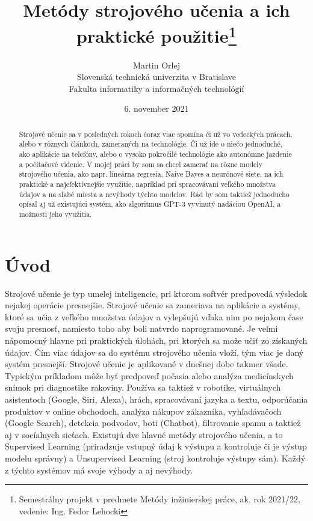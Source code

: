 \documentclass[8pt,oneside,slovak,a4paper]{article}
\title{Metódy strojového učenia a ich praktické použitie\thanks{Semestrálny projekt v predmete Metódy inžinierskej práce, ak. rok 2021/22, vedenie: Ing. Fedor Lehocki}}
\author{Martin Orlej\\[2pt]
	{\small Slovenská technická univerzita v Bratislave}\\
	{\small Fakulta informatiky a informačných technológií}\\
	}
\date{\small 6. november 2021}
\begin{document}
\maketitle
\newpage
\begin{abstract}
Strojové učenie sa v posledných rokoch čoraz viac spomína či už vo vedeckých prácach, alebo v rôznych článkoch, zameraných na technológie. Či už ide o niečo jednoduché, ako aplikácie na telefóny, alebo o vysoko pokročilé technológie ako autonómne jazdenie a počítačové videnie.
\newline \hspace*{0.4cm} V mojej práci by som sa chcel zamerať na rôzne modely strojového učenia, ako napr. lineárna regresia, Naive Bayes a neurónové siete, na ich praktické a najefektívnejšie využitie, napríklad pri spracovávaní veľkého množstva údajov a na slabé miesta a nevýhody týchto modelov.
\newline \hspace*{0.4cm} Rád by som taktiež jednoducho opísal aj už existujúci systém, ako algoritmus GPT-3 vyvinutý nadáciou OpenAI, a možnosti jeho využitia.
\end{abstract}
\section{Úvod} \label {uvod}
Strojové učenie je typ umelej inteligencie, pri ktorom softvér predpovedá výsledok nejakej operácie presnejšie. Strojové učenie sa zameriava na aplikácie a systémy, ktoré sa učia z veľkého množstva údajov a vylepšujú vďaka nim po nejakom čase svoju presnosť, namiesto toho aby boli natvrdo naprogramované. Je veľmi nápomocný hlavne pri praktických úlohách, pri ktorých sa može učiť zo získaných údajov. Čím viac údajov sa do systému strojového učenia vloží, tým viac je daný systém presnejší. 
\newline \hspace*{0.4cm}Strojové učenie je aplikované  v dnešnej dobe takmer všade. Typickým príkladom môže byť predpoveď počasia alebo analýza medicínskych snímok pri diagnostike rakoviny. Používa sa taktiež v robotike, virtuálnych asistentoch (Google, Siri, Alexa), hrách, spracovávaní jazyka a textu, odporúčania produktov v online obchodoch, analýza nákupov zákazníka, vyhľadávačoch (Google Search), detekcia podvodov, boti (Chatbot), filtrovanie spamu a taktiež aj v socíalnych sieťach. 
\newline \hspace*{0.4cm}Existujú dve hlavné metódy strojového učenia, a to Supervised Learning (priradzuje vstupný údaj k výstupu a kontroluje či je výstup modelu správny) a Unsupervised Learning (stroj kontroluje výstupy sám). Každý z týchto systémov má svoje výhody a aj nevýhody.
\end{document}
